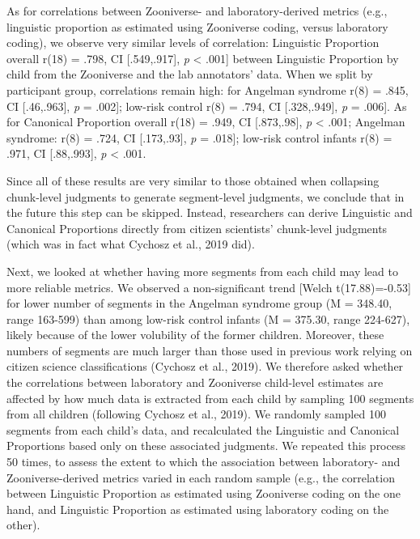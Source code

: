 \documentclass[english,,man]{apa6}
\begin{document}
As for correlations between Zooniverse- and laboratory-derived metrics (e.g., linguistic proportion as estimated using Zooniverse coding, versus laboratory coding), we observe very similar levels of correlation: Linguistic Proportion overall r(18) = .798, CI {[}.549,.917{]}, \emph{p} \textless{} .001{]} between Linguistic Proportion by child from the Zooniverse and the lab annotators' data. When we split by participant group, correlations remain high: for Angelman syndrome r(8) = .845, CI {[}.46,.963{]}, \emph{p} = .002{]}; low-risk control r(8) = .794, CI {[}.328,.949{]}, \emph{p} = .006{]}. As for Canonical Proportion overall r(18) = .949, CI {[}.873,.98{]}, \emph{p} \textless{} .001; Angelman syndrome: r(8) = .724, CI {[}.173,.93{]}, \emph{p} = .018{]}; low-risk control infants r(8) = .971, CI {[}.88,.993{]}, \emph{p} \textless{} .001.

Since all of these results are very similar to those obtained when collapsing chunk-level judgments to generate segment-level judgments, we conclude that in the future this step can be skipped. Instead, researchers can derive Linguistic and Canonical Proportions directly from citizen scientists' chunk-level judgments (which was in fact what Cychosz et al., 2019 did).

Next, we looked at whether having more segments from each child may lead to more reliable metrics. We observed a non-significant trend {[}Welch t(17.88)=-0.53{]} for lower number of segments in the Angelman syndrome group (M = 348.40, range 163-599) than among low-risk control infants (M = 375.30, range 224-627), likely because of the lower volubility of the former children. Moreover, these numbers of segments are much larger than those used in previous work relying on citizen science classifications (Cychosz et al., 2019). We therefore asked whether the correlations between laboratory and Zooniverse child-level estimates are affected by how much data is extracted from each child by sampling 100 segments from all children (following Cychosz et al., 2019). We randomly sampled 100 segments from each child's data, and recalculated the Linguistic and Canonical Proportions based only on these associated judgments. We repeated this process 50 times, to assess the extent to which the association between laboratory- and Zooniverse-derived metrics varied in each random sample (e.g., the correlation between Linguistic Proportion as estimated using Zooniverse coding on the one hand, and Linguistic Proportion as estimated using laboratory coding on the other).
\end{document}
